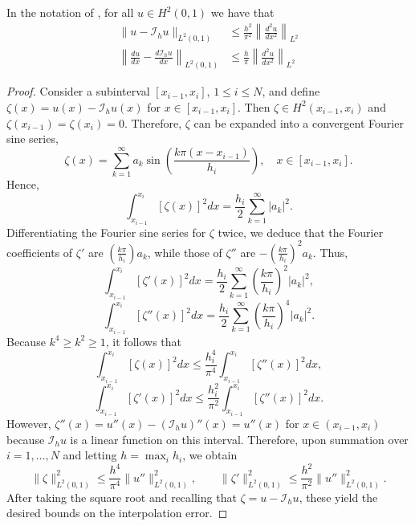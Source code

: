 \begin{lemma}[Error of the piece-wise linear interpolation in $d=1$ from \cite{Suli}]
    \label{ex:Galerkin Laplace piecewise linear Cea}
    In the notation of , for all $u \in H^2(0,1)$ we have that
    \begin{align*}
        \| u - \mathcal I_h u \|_{L^2(0,1)}
         & \le \frac{h^2}{\pi^2} \left\| \frac{d^2u}{dx^2}  \right\|_{L^2} \\
        \left\| \frac{du}{dx} - \frac{d \mathcal I_h u}{dx} \right\|_{L^2(0,1)}
         & \le \frac{h}{\pi} \left\| \frac{d^2u}{dx^2}  \right\|_{L^2}
    \end{align*}
\end{lemma}
\begin{proof}
    Consider a subinterval $[x_{i-1}, x_i]$, $1 \leq i \leq N$, and define $\zeta(x) = u(x) - \mathcal I_h u(x)$ for $x \in [x_{i-1}, x_i]$. Then $\zeta \in H^2(x_{i-1}, x_i)$ and $\zeta(x_{i-1}) = \zeta(x_i) = 0$. Therefore, $\zeta$ can be expanded into a convergent Fourier sine series,
    \[
        \zeta(x) = \sum_{k=1}^\infty a_k \sin\left(\frac{k\pi(x - x_{i-1})}{h_i}\right), \quad x \in [x_{i-1}, x_i].
    \]
    Hence,
    \[
        \int_{x_{i-1}}^{x_i} [\zeta(x)]^2 dx = \frac{h_i}{2} \sum_{k=1}^\infty |a_k|^2.
    \]
    Differentiating the Fourier sine series for $\zeta$ twice, we deduce that the Fourier coefficients of $\zeta'$ are $\left(\frac{k\pi}{h_i}\right)a_k$, while those of $\zeta''$ are $-\left(\frac{k\pi}{h_i}\right)^2 a_k$. Thus,
    \[
        \int_{x_{i-1}}^{x_i} [\zeta'(x)]^2 dx = \frac{h_i}{2} \sum_{k=1}^\infty \left(\frac{k\pi}{h_i}\right)^2 |a_k|^2,
    \]
    \[
        \int_{x_{i-1}}^{x_i} [\zeta''(x)]^2 dx = \frac{h_i}{2} \sum_{k=1}^\infty \left(\frac{k\pi}{h_i}\right)^4 |a_k|^2.
    \]
    Because $k^4 \geq k^2 \geq 1$, it follows that
    \[
        \int_{x_{i-1}}^{x_i} [\zeta(x)]^2 dx \leq \frac{h_i^4}{\pi^4} \int_{x_{i-1}}^{x_i} [\zeta''(x)]^2 dx,
    \]
    \[
        \int_{x_{i-1}}^{x_i} [\zeta'(x)]^2 dx \leq \frac{h_i^2}{\pi^2} \int_{x_{i-1}}^{x_i} [\zeta''(x)]^2 dx.
    \]
    However, $\zeta''(x) = u''(x) - (\mathcal I_h u)''(x) = u''(x)$ for $x \in (x_{i-1}, x_i)$ because $\mathcal I_h u$ is a linear function on this interval. Therefore, upon summation over $i = 1, \ldots, N$ and letting $h = \max_i h_i$, we obtain
    \[
        \|\zeta\|^2_{L^2(0,1)} \leq \frac{h^4}{\pi^4} \|u''\|^2_{L^2(0,1)}, \qquad
        \|\zeta'\|^2_{L^2(0,1)} \leq \frac{h^2}{\pi^2} \|u''\|^2_{L^2(0,1)}.
    \]
    After taking the square root and recalling that $\zeta = u - \mathcal I_h u$, these yield the desired bounds on the interpolation error.


\end{proof}
